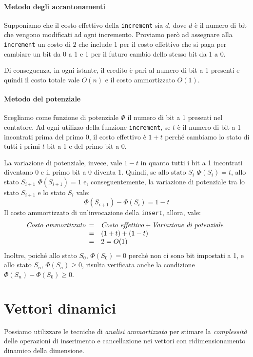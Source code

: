 \begin{eg}
\paragraph{Metodo degli accantonamenti}
Supponiamo che il costo effettivo della \texttt{increment} sia $d$, dove $d$ è
il numero di bit che vengono modificati ad ogni incremento. Proviamo però ad
assegnare alla \texttt{increment} un costo di $2$ che include 1 per il costo
effettivo che si paga per cambiare un bit da 0 a 1 e 1 per il futuro cambio
dello stesso bit da 1 a 0.

Di conseguenza, in ogni istante, il credito è pari al numero di bit a 1
presenti e quindi il costo totale vale $O(n)$ e il costo ammortizzato $O(1)$.

\paragraph{Metodo del potenziale}
Scegliamo come funzione di potenziale $\Phi$ il numero di bit a 1 presenti nel
contatore. Ad ogni utilizzo della funzione \texttt{increment}, se $t$ è il numero
di bit a 1 incontrati prima del primo 0, il costo effettivo è $1+t$ perché
cambiamo lo stato di tutti i primi $t$ bit a 1 e del primo bit a 0.

La variazione di potenziale, invece, vale $1-t$ in quanto tutti i bit a 1
incontrati diventano 0 e il primo bit a 0 diventa 1. Quindi, se allo stato $S_i$
$\Phi(S_i)=t$, allo stato $S_{i+1}$ $\Phi(S_{i+1})=1$ e, conseguentemente, la
variazione di potenziale tra lo stato $S_{i+1}$ e lo stato $S_i$ vale:
\[\Phi(S_{i+1})-\Phi(S_i)=1-t\]
Il costo ammortizzato di un'invocazione della \texttt{insert}, allora, vale:
\[\emph{Costo ammortizzato}\begin{array}[t]{cl}
    = & \emph{Costo effettivo}+\emph{Variazione di potenziale}\\
    = & (1+t)+(1-t)\\
    = & 2 = O(1)
\end{array}\]
Inoltre, poiché allo stato $S_0$, $\Phi(S_0)=0$ perché non ci sono bit impostati a
1, e allo stato $S_n$, $\Phi(S_n)\geq0$, risulta verificata anche la
condizione $\Phi(S_n)-\Phi(S_0)\geq0$.
\end{eg}

\section{Vettori dinamici}
Possiamo utilizzare le tecniche di \emph{analisi ammortizzata} per stimare la
\emph{complessità} delle operazioni di inserimento e cancellazione nei vettori
con ridimensionamento dinamico della dimensione.

